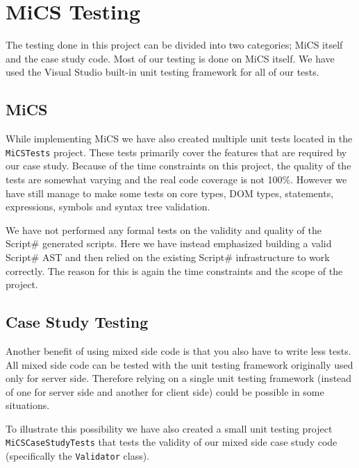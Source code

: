 \chapter{MiCS Testing}
	The testing done in this project can be divided into two categories; MiCS itself and the case study code. Most of our testing is done on MiCS itself. We have used the Visual Studio built-in unit testing framework for all of our tests.
\section{MiCS} %
\label{sec:mics}
	While implementing MiCS we have also created multiple unit tests located in the \texttt{MiCSTests} project. These tests primarily cover the features that are required by our case study. Because of the time constraints on this project, the quality of the tests are somewhat varying and the real code coverage is not 100\%. However we have still manage to make some tests on core types, DOM types, statements, expressions, symbols and syntax tree validation.

	We have not performed any formal tests on the validity and quality of the Script\# generated scripts. Here we have instead emphasized building a valid Script\# AST and then relied on the existing Script\# infrastructure to work correctly. The reason for this is again the time constraints and the scope of the project.
\section{Case Study Testing} %
\label{sec:user_code_testing}
	Another benefit of using mixed side code is that you also have to write less tests. All mixed side code can be tested with the unit testing framework originally used only for server side. Therefore relying on a single unit testing framework (instead of one for server side and another for client side) could be possible in some situations.

	To illustrate this possibility we have also created a small unit testing project \texttt{MiCSCaseStudyTests} that tests the validity of our mixed side case study code (specifically the \texttt{Validator} class).

